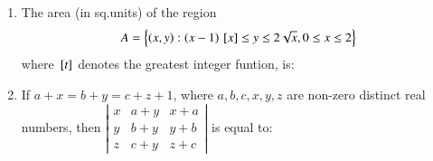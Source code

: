 \documentclass[journal,12pt,onecolumn]{IEEEtran}
\theoremstyle{remark}
\begin{document}
\begin{enumerate}
\begin{enumerate}
      \end{enumerate}
      \item The area (in sq.units) of the region 
	      \begin{align}
		      A = \left\{\left(x,y\right):\left(x-1\right) {}\left[x\right] \leq y \leq 2\sqrt{x}, 0\leq x\leq 2\right\}
	      \end{align}
	      where ${}\left[t\right]$ denotes the greatest integer funtion, is:
      \begin{enumerate}
      \end{enumerate}
     \item If $a+x=b+y=c+z+1$, where $a, b, c, x, y, z$ are non-zero distinct real numbers, then  
    $\left| \begin{matrix} x & a+y & x+a \\ y & b+y & y+b \\z & c+y & z+c  \end{matrix} \right|$ is equal to:
     \begin{enumerate}
      \end{enumerate}

      
 \end{enumerate}
 
\end{document}
